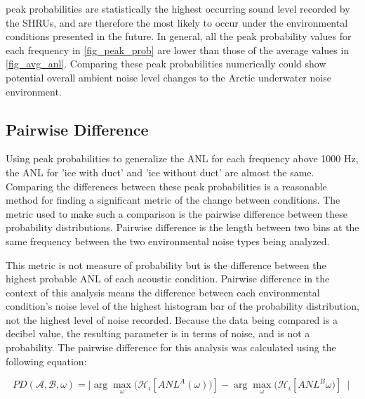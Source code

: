 peak probabilities are statistically the highest occurring sound level recorded by the SHRUs, and are therefore the most likely to occur under the environmental conditions presented in the future. In general, all the peak probability values for each frequency in \autoref{fig_peak_prob} are lower than those of the average values in \autoref{fig_avg_anl}. Comparing these peak probabilities numerically could show potential overall ambient noise level changes to the Arctic underwater noise environment.  


\subsection{Pairwise Difference} \label{sec_pairdiff}

Using peak probabilities to generalize the ANL for each frequency above 1000 Hz, the ANL for 'ice with duct' and 'ice without duct' are almost the same. Comparing the differences between these peak probabilities is a reasonable method for finding a significant metric of the change between conditions. The metric used to make such a comparison is the pairwise difference between these probability distributions. Pairwise difference is the length between two bins at the same frequency between the two environmental noise types being analyzed. 

This metric is not measure of probability but is the difference between the highest probable ANL of each acoustic condition. Pairwise difference in the context of this analysis means the difference between each environmental condition's noise level of the highest histogram bar of the probability distribution, not the highest level of noise recorded. Because the data being compared is a decibel value, the resulting parameter is in terms of noise, and is not a probability. The pairwise difference for this analysis was calculated using the following equation:

\begin{equation}
PD(\mathcal{A},\mathcal{B},\omega)=\mid \arg \max_{\omega} (\mathcal{H}_{i} [ANL ^{A}(\omega))]- \arg\max_{\omega}(\mathcal{H}_{i} [ANL^{B}\omega)]\ \mid 	%
\end{equation}


